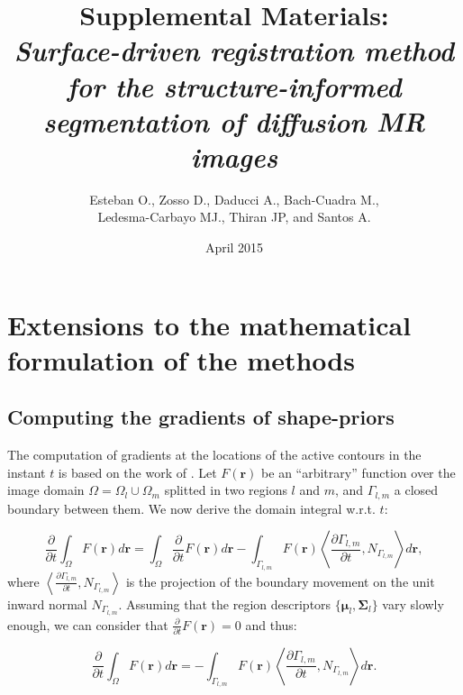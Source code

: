 \documentclass[a4paper]{report}
\renewcommand{\vec}[1]{\mathbf{#1}}
\begin{document}
\title{Supplemental Materials: \\ \emph{Surface-driven registration method for the structure-informed segmentation of diffusion MR images}}
\author{Esteban O., Zosso D., Daducci A., Bach-Cuadra M., \\ Ledesma-Carbayo MJ., Thiran JP, and Santos A.}
\date{April 2015}

\maketitle
\section{Extensions to the mathematical formulation of the methods}\label{sec:regseg-maths_extension}

\subsection{Computing the gradients of shape-priors}\label{sec:regseg-shape_priors}
The computation of gradients at the locations of the active contours in the
  instant $t$ is based on the work of \cite{herbulot_segmentation_2006}.
Let $F(\vec{r})$ be an ``arbitrary'' function over the image domain
  $\Omega = \Omega_l \cup \Omega_m$ splitted in two regions $l$ and
  $m$, and $\Gamma_{l,m}$ a closed boundary between them.
We now derive the domain integral w.r.t. $t$:

  \begin{equation}
  \frac{\partial}{\partial t} \int_\Omega F(\vec{r}) d\vec{r} =
  \int_\Omega \frac{\partial}{\partial t}F(\vec{r}) d\vec{r}
  - \int_{\Gamma_{l,m}} F(\vec{r}) \left\langle \frac{\partial \Gamma_{l,m} }{\partial t},
  N_{\Gamma_{l,m}}\right\rangle d\vec{r},
  \end{equation}
%
  where $\left\langle\frac{\partial\Gamma_{l,m}}{\partial t}, N_{\Gamma_{l,m}}\right\rangle$ is
  the projection of the boundary movement on the unit inward normal $N_{\Gamma_{l,m}}$.
Assuming that the region descriptors $\{\boldsymbol{\mu}_l, \boldsymbol{\Sigma}_l\}$ vary slowly enough, we can consider
  that $\frac{\partial}{\partial t} F(\vec{r}) = 0$ and thus:

  \begin{equation}
  \frac{\partial}{\partial t} \int_\Omega F(\vec{r}) d\vec{r} =
  - \int_{\Gamma_{l,m}} F(\vec{r}) \left\langle \frac{\partial \Gamma_{l,m} }{\partial t},
  N_{\Gamma_{l,m}}\right\rangle d\vec{r}.
  \label{eq:regseg-shape_gradients}
  \end{equation}
\end{document}
